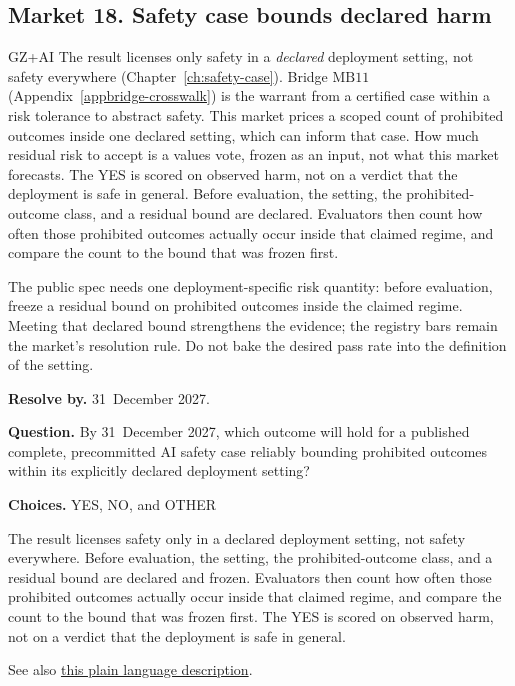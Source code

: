 \subsection{Market 18. Safety case bounds declared harm}
\label{sec:appp-m18}

\begin{authbar}{GZ+AI}
The result licenses only safety in a \emph{declared} deployment setting, not safety everywhere (Chapter~\ref{ch:safety-case}).
Bridge \(\text{MB11}\) (Appendix~\ref{appbridge-crosswalk}) is the warrant from a certified case within a risk tolerance to abstract safety.
This market prices a scoped count of prohibited outcomes inside one declared setting, which can inform that case.
How much residual risk to accept is a values vote, frozen as an input, not what this market forecasts.
The YES is scored on observed harm, not on a verdict that the deployment is safe in general.
Before evaluation, the setting, the prohibited-outcome class, and a residual bound are declared.
Evaluators then count how often those prohibited outcomes actually occur inside that claimed regime, and compare the count to the bound that was frozen first.

The public spec needs one deployment-specific risk quantity: before evaluation, freeze a residual bound on prohibited outcomes inside the claimed regime.
Meeting that declared bound strengthens the evidence; the registry bars remain the market's resolution rule.
Do not bake the desired pass rate into the definition of the setting.
\end{authbar}
\begin{predictionbox}
\textbf{Resolve by.} 31~December 2027.

\textbf{Question.}
By 31~December 2027, which outcome will hold for a published complete, precommitted AI safety case reliably bounding prohibited outcomes within its explicitly declared deployment setting?

\textbf{Choices.} YES, NO, and OTHER
\end{predictionbox}
\begin{predictionbackground}
The result licenses safety only in a declared deployment setting, not safety everywhere.
Before evaluation, the setting, the prohibited-outcome class, and a residual bound are declared and frozen.
Evaluators then count how often those prohibited outcomes actually occur inside that claimed regime, and compare the count to the bound that was frozen first.
The YES is scored on observed harm, not on a verdict that the deployment is safe in general.

See also \href{https://towards-alignment.com/cards/deployment-gate/}{this plain language description}.
\end{predictionbackground}
